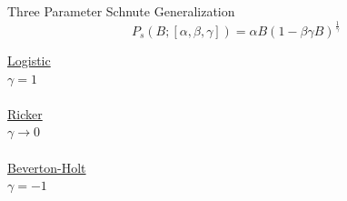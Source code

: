 \documentclass[ xcolor = pdftex, dvipsnames, table ]{beamer}
\begin{document}
%
\begin{frame}{Three Parameter Schnute Generalization}
\vspace{-0.25cm}
\begin{equation*}
P_s(B;[\alpha, \beta, \gamma]) = \alpha B(1-\beta\gamma B)^{\frac{1}{\gamma}}
\end{equation*}
%
\begin{minipage}[h!]{0.46\textwidth}
        \vspace{-1cm}
        \begin{center}
        {\color{Red}\underline{Logistic}}\\
        $\gamma = 1$\\$~$\\
        {\color{RoyalBlue}\underline{Ricker}}\\
        $\gamma \rightarrow 0$\\$~$\\   %
        {\color{ForestGreen}\underline{Beverton-Holt}}\\
        $\gamma = -1$           %
        \end{center}
\end{minipage}
\begin{minipage}[h!]{0.52\textwidth}	

\end{minipage}
\end{frame}
\end{document}
